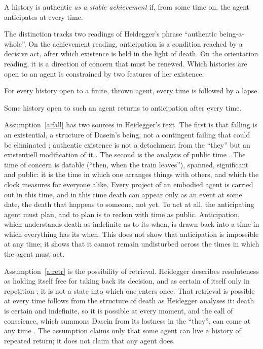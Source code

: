 \documentclass{situationist-preprint}
\begin{document}
\begin{definition}\label{d:ach}
A history is authentic \emph{as a stable achievement} if, from some time on, the agent anticipates at every time.
\end{definition}

The distinction tracks two readings of Heidegger's phrase \enquote{authentic being-a-whole}. On the achievement reading, anticipation is a condition reached by a decisive act, after which existence is held in the light of death. On the orientation reading, it is a direction of concern that must be renewed. Which histories are open to an agent is constrained by two features of her existence.

\begin{assumption}\label{a:fall}
For every history open to a finite, thrown agent, every time is followed by a lapse.
\end{assumption}

\begin{assumption}[Retrieval]\label{a:retr}
Some history open to such an agent returns to anticipation after every time.
\end{assumption}

Assumption~\ref{a:fall} has two sources in Heidegger's text. The first is that falling is an existential, a structure of Dasein's being, not a contingent failing that could be eliminated \citep[\S 38]{Heidegger1927}; authentic existence is not a detachment from the \enquote{they} but an existentiell modification of it \citep[\S 27]{Heidegger1927}. The second is the analysis of public time \citep[\S\S 79--81]{Heidegger1927}. The time of concern is datable (\enquote{then, when the train leaves}), spanned, significant and public: it is the time in which one arranges things with others, and which the clock measures for everyone alike. Every project of an embodied agent is carried out in this time, and in this time death can appear only as an event at some date, the death that happens to someone, not yet. To act at all, the anticipating agent must plan, and to plan is to reckon with time as public. Anticipation, which understands death as indefinite as to its when, is drawn back into a time in which everything has its when. This does not show that anticipation is impossible at any time; it shows that it cannot remain undisturbed across the times in which the agent must act.

Assumption~\ref{a:retr} is the possibility of retrieval. Heidegger describes resoluteness as holding itself free for taking back its decision, and as certain of itself only in repetition \citep[\S\S 60, 62, 68]{Heidegger1927}; it is not a state into which one enters once. That retrieval is possible at every time follows from the structure of death as Heidegger analyses it: death is certain and indefinite, so it is possible at every moment, and the call of conscience, which summons Dasein from its lostness in the \enquote{they}, can come at any time \citep[\S 57]{Heidegger1927}. The assumption claims only that some agent can live a history of repeated return; it does not claim that any agent does.
\end{document}
